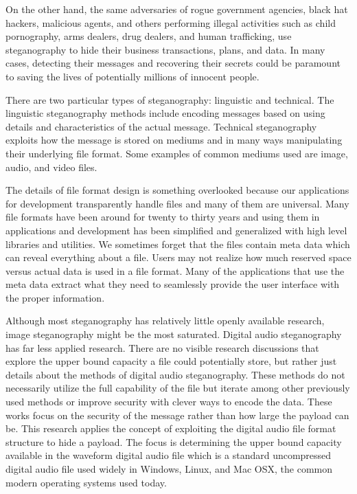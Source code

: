 \documentclass[letterpaper]{article}
\begin{document}
On the other hand, the same adversaries of rogue government agencies, black hat hackers, malicious agents, and others performing illegal activities such as child pornography, arms dealers, drug dealers, and human trafficking, use steganography to hide their business transactions, plans, and data. In many cases, detecting their messages and recovering their secrets could be paramount to saving the lives of potentially millions of innocent people. 

There are two particular types of steganography: linguistic and technical. The linguistic steganography methods include encoding messages based on using details and characteristics of the actual message. Technical steganography exploits how the message is stored on mediums and in many ways manipulating their underlying file format.\cite{survey} Some examples of common mediums used are image, audio, and video files.

The details of file format design is something overlooked because our applications for development transparently handle files and many of them are universal. Many file formats have been around for twenty to thirty years and using them in applications and development has been simplified and generalized with high level libraries and utilities. We sometimes forget that the files contain meta data which can reveal everything about a file. Users may not realize how much reserved space versus actual data is used in a file format. Many of the applications that use the meta data extract what they need to seamlessly provide the user interface with the proper information.  

Although most steganography has relatively little openly available research, image steganography might be the most saturated. Digital audio steganography has far less applied research.  \cite{avcibas2006audio} There are no visible research discussions that explore the upper bound capacity a file could potentially store, but rather just details about the methods of digital audio steganography. These methods do not necessarily utilize the full capability of the file but iterate among other previously used methods or improve security with clever ways to encode the data. These works focus on the security of the message rather than how large the payload can be. This research applies the concept of exploiting the digital audio file format structure to hide a payload. The focus is determining the upper bound capacity available in the waveform digital audio file which is a standard uncompressed digital audio file used widely in Windows, Linux, and Mac OSX, the common modern operating systems used today.
\end{document}
